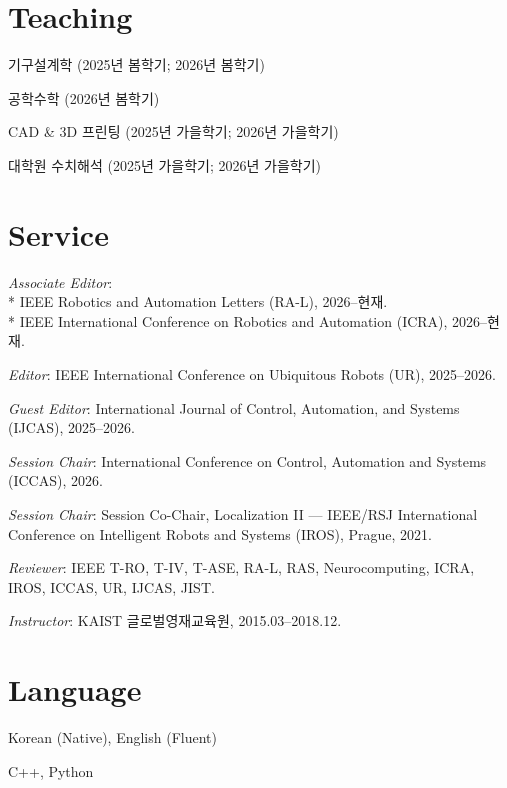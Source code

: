 \documentclass[margin]{res}
\begin{document}
\begin{resume}
		
		\section{Teaching}
		\par 기구설계학 (2025년 봄학기; 2026년 봄학기)
		\par 공학수학 (2026년 봄학기)
		\par CAD \& 3D 프린팅 (2025년 가을학기; 2026년 가을학기)
		\par 대학원 수치해석 (2025년 가을학기; 2026년 가을학기)

		\section{Service}
		\par \textit{Associate Editor}:\\*
		IEEE Robotics and Automation Letters (RA-L), 2026--현재.\\*
		IEEE International Conference on Robotics and Automation (ICRA), 2026--현재.

		\par \textit{Editor}: IEEE International Conference on Ubiquitous Robots (UR), 2025--2026.

		\par \textit{Guest Editor}: International Journal of Control, Automation, and Systems (IJCAS), 2025--2026.

		\par \textit{Session Chair}: International Conference on Control, Automation and Systems (ICCAS), 2026.

		\par \textit{Session Chair}: Session Co-Chair, Localization II --- IEEE/RSJ International Conference on Intelligent Robots and Systems (IROS), Prague, 2021.

		\par \textit{Reviewer}: IEEE T-RO, T-IV, T-ASE, RA-L, RAS, Neurocomputing, ICRA, IROS, ICCAS, UR, IJCAS, JIST.

		\par \textit{Instructor}: KAIST 글로벌영재교육원, 2015.03--2018.12.

		\section{Language}
		\par Korean (Native), English (Fluent)
		\par C++, Python
				
	\end{resume}
\end{document}

